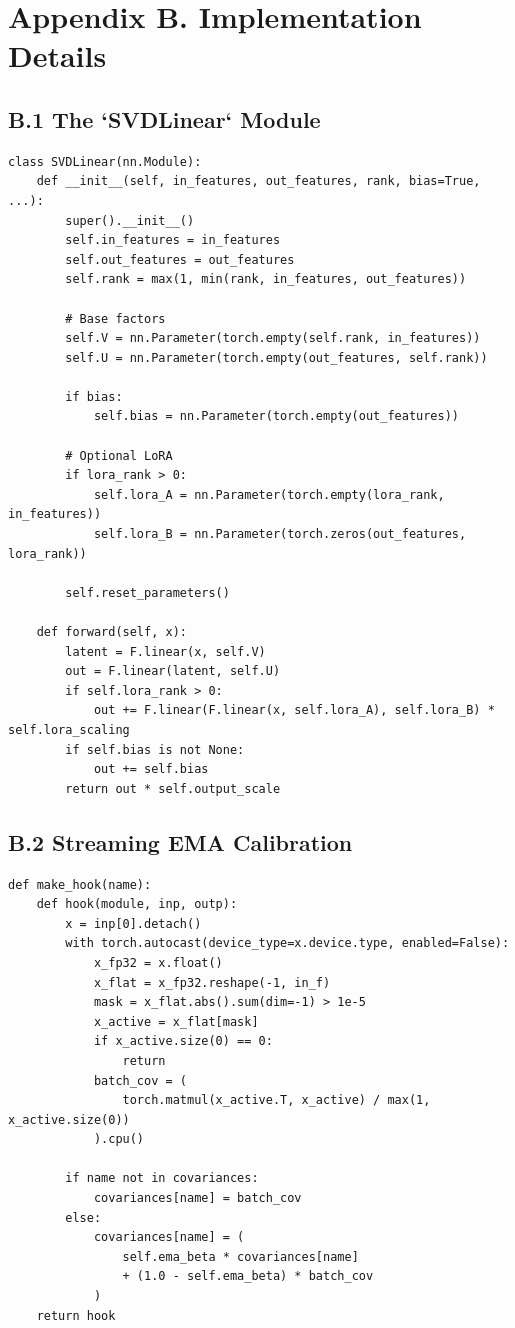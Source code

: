 
\section{Appendix B. Implementation Details}

\subsection{B.1 The `SVDLinear` Module}

\begin{lstlisting}
class SVDLinear(nn.Module):
    def __init__(self, in_features, out_features, rank, bias=True, ...):
        super().__init__()
        self.in_features = in_features
        self.out_features = out_features
        self.rank = max(1, min(rank, in_features, out_features))
        
        # Base factors
        self.V = nn.Parameter(torch.empty(self.rank, in_features))
        self.U = nn.Parameter(torch.empty(out_features, self.rank))
        
        if bias:
            self.bias = nn.Parameter(torch.empty(out_features))
        
        # Optional LoRA
        if lora_rank > 0:
            self.lora_A = nn.Parameter(torch.empty(lora_rank, in_features))
            self.lora_B = nn.Parameter(torch.zeros(out_features, lora_rank))
        
        self.reset_parameters()
    
    def forward(self, x):
        latent = F.linear(x, self.V)
        out = F.linear(latent, self.U)
        if self.lora_rank > 0:
            out += F.linear(F.linear(x, self.lora_A), self.lora_B) * self.lora_scaling
        if self.bias is not None:
            out += self.bias
        return out * self.output_scale
\end{lstlisting}

\subsection{B.2 Streaming EMA Calibration}

\begin{lstlisting}
def make_hook(name):
    def hook(module, inp, outp):
        x = inp[0].detach()
        with torch.autocast(device_type=x.device.type, enabled=False):
            x_fp32 = x.float()
            x_flat = x_fp32.reshape(-1, in_f)
            mask = x_flat.abs().sum(dim=-1) > 1e-5
            x_active = x_flat[mask]
            if x_active.size(0) == 0:
                return
            batch_cov = (
                torch.matmul(x_active.T, x_active) / max(1, x_active.size(0))
            ).cpu()
        
        if name not in covariances:
            covariances[name] = batch_cov
        else:
            covariances[name] = (
                self.ema_beta * covariances[name]
                + (1.0 - self.ema_beta) * batch_cov
            )
    return hook
\end{lstlisting}

